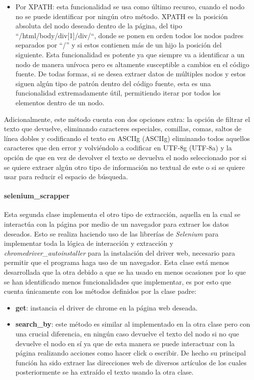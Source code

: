 \begin{itemize}
\begin{itemize}
        \item Por XPATH: esta funcionalidad se usa como último recurso, cuando
        el nodo no se puede identificar por ningún otro método. XPATH es la
        posición absoluta del nodo deseado dentro de la página, del tipo
        ``/html/body/div[1]/div/``, donde se ponen en orden todos los nodos padres
        separados por “/” y si estos contienen más de un hijo la posición del
        siguiente. Esta funcionalidad es potente ya que siempre va a identificar
        a un nodo de manera unívoca pero es altamente susceptible a cambios en
        el código fuente. De todas formas, si se desea extraer datos de
        múltiples nodos y estos siguen algún tipo de patrón dentro del código
        fuente, esta es una funcionalidad extremadamente útil, permitiendo
        iterar por todos los elementos dentro de un nodo. 
    \end{itemize}
    Adicionalmente, este método cuenta con dos opciones extra: la opción de
    filtrar el texto que devuelve, eliminando caracteres especiales, comillas,
    comas, saltos de línea dobles y codificando el texto en \gls{ASCIIg} (\gls{ASCIIg}) eliminando todos
    aquellos caracteres que den error y volviéndolo a codificar en \gls{UTF-8g} (\gls{UTF-8a}) y la opción
    de que en vez de devolver el texto se devuelva el nodo seleccionado por si se
    quiere extraer algún otro tipo de información no textual de este o si se quiere
    usar para reducir el espacio de búsqueda.
\end{itemize}


\paragraph{selenium\_scrapper} Esta segunda clase implementa el otro tipo de extracción,
aquella en la cual se interactúa con la página por medio de un navegador para
extraer los datos deseados. Esto se realiza haciendo uso de las librerías de
\textit{Selenium} para implementar toda la lógica de interacción y extracción y
\textit{chromedriver\_autoinstaller} para la instalación del driver web, necesario para
permitir que el programa haga uso de un navegador. Esta clase está menos
desarrollada que la otra debido a que se ha usado en menos ocasiones por lo que
se han identificado menos funcionalidades que implementar, es por esto que
cuenta únicamente con los métodos definidos por la clase padre: 

\begin{itemize}
    \item \textbf{get}: instancia el driver de chrome en la página web deseada. 
    \item \textbf{search\_by}: este método es similar al implementado en la otra clase
    pero con una crucial diferencia, en ningún caso devuelve el texto del nodo
    si no que devuelve el nodo en sí ya que de esta manera se puede interactuar
    con la página realizando acciones como hacer click o escribir. De hecho su principal
    función ha sido extraer las direcciones web de diversos artículos de los
    cuales posteriormente se ha extraído el texto usando la otra clase. 
\end{itemize}

